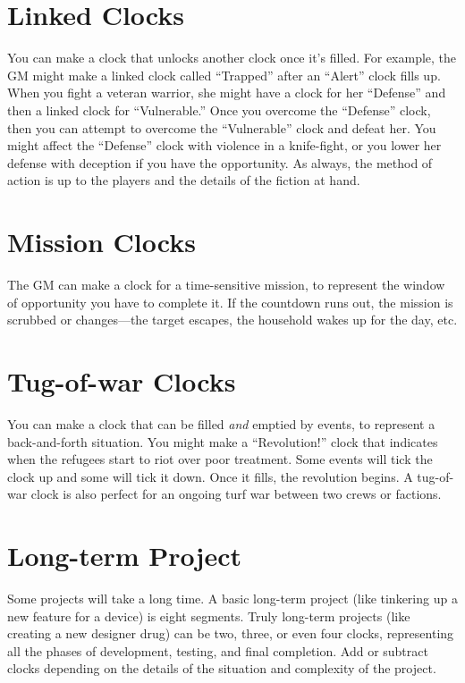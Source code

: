 \documentclass[11pt,oneside]{book}
\begin{document}
\section{Linked Clocks}

You can make a clock that unlocks another clock once it’s filled. For example, the GM might make a linked clock called “Trapped” after an “Alert” clock fills up. When you fight a veteran warrior, she might have a clock for her “Defense” and then a linked clock for “Vulnerable.” Once you overcome the “Defense” clock, then you can attempt to overcome the “Vulnerable” clock and defeat her.  You might affect the “Defense” clock with violence in a knife-fight, or you lower her defense with deception if you have the opportunity. As always, the method of action is up to the players and the details of the fiction at hand.

\section{Mission Clocks}

The GM can make a clock for a time-sensitive mission, to represent the window of opportunity you have to complete it. If the countdown runs out, the mission is scrubbed or changes---the target escapes, the household wakes up for the day, etc.

\section{Tug-of-war Clocks}

You can make a clock that can be filled \emph{and} emptied by events, to represent a back-and-forth situation. You might make a “Revolution!” clock that indicates when the refugees start to riot over poor treatment. Some events will tick the clock up and some will tick it down. Once it fills, the revolution begins. A tug-of-war clock is also perfect for an ongoing turf war between two crews or factions.

\section{Long-term Project}

Some projects will take a long time. A basic long-term project (like tinkering up a new feature for a device) is eight segments. Truly long-term projects (like creating a new designer drug) can be two, three, or even four clocks, representing all the phases of development, testing, and final completion. Add or subtract clocks depending on the details of the situation and complexity of the project.
\end{document}
